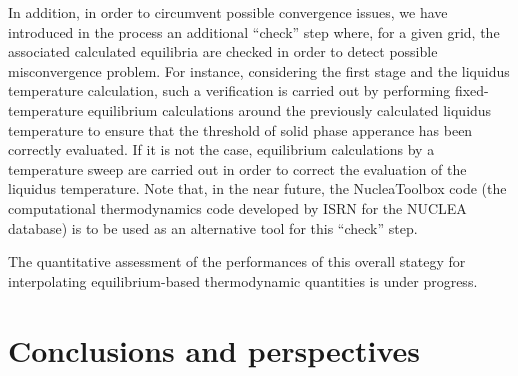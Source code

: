 \documentclass[11pt]{article}\usepackage{geometry} \geometry{letterpaper, margin=25.4mm}
\begin{document}
In addition, in order to circumvent possible convergence issues, we have introduced in the process an additional ``check'' step where, for a given grid, the associated calculated equilibria are checked in order to detect possible misconvergence problem. For instance, considering the first stage and the liquidus temperature calculation, such a verification is carried out by performing fixed-temperature equilibrium calculations around the previously calculated liquidus temperature to ensure that the threshold of solid phase apperance has been correctly evaluated. If it is not the case, equilibrium calculations by a temperature sweep are carried out in order to correct the evaluation of the liquidus temperature. Note that, in the near future, the NucleaToolbox code (the computational thermodynamics code developed by ISRN for the NUCLEA database) is to be used as an alternative tool for this ``check'' step.

The quantitative assessment of the performances of this overall stategy for interpolating equilibrium-based thermodynamic quantities is under progress.

\section{Conclusions and perspectives} \label{sect:concl}
\end{document}
